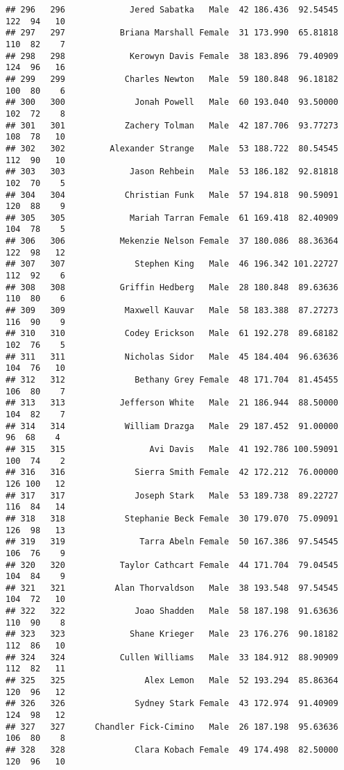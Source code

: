 \documentclass[
]{article}
\begin{document}
\begin{verbatim}
## 296   296             Jered Sabatka   Male  42 186.436  92.54545 122  94   10
## 297   297           Briana Marshall Female  31 173.990  65.81818 110  82    7
## 298   298             Kerowyn Davis Female  38 183.896  79.40909 124  96   16
## 299   299            Charles Newton   Male  59 180.848  96.18182 100  80    6
## 300   300              Jonah Powell   Male  60 193.040  93.50000 102  72    8
## 301   301            Zachery Tolman   Male  42 187.706  93.77273 108  78   10
## 302   302         Alexander Strange   Male  53 188.722  80.54545 112  90   10
## 303   303             Jason Rehbein   Male  53 186.182  92.81818 102  70    5
## 304   304            Christian Funk   Male  57 194.818  90.59091 120  88    9
## 305   305             Mariah Tarran Female  61 169.418  82.40909 104  78    5
## 306   306           Mekenzie Nelson Female  37 180.086  88.36364 122  98   12
## 307   307              Stephen King   Male  46 196.342 101.22727 112  92    6
## 308   308           Griffin Hedberg   Male  28 180.848  89.63636 110  80    6
## 309   309            Maxwell Kauvar   Male  58 183.388  87.27273 116  90    9
## 310   310            Codey Erickson   Male  61 192.278  89.68182 102  76    5
## 311   311            Nicholas Sidor   Male  45 184.404  96.63636 104  76   10
## 312   312              Bethany Grey Female  48 171.704  81.45455 106  80    7
## 313   313           Jefferson White   Male  21 186.944  88.50000 104  82    7
## 314   314            William Drazga   Male  29 187.452  91.00000  96  68    4
## 315   315                 Avi Davis   Male  41 192.786 100.59091 100  74    2
## 316   316              Sierra Smith Female  42 172.212  76.00000 126 100   12
## 317   317              Joseph Stark   Male  53 189.738  89.22727 116  84   14
## 318   318            Stephanie Beck Female  30 179.070  75.09091 126  98   13
## 319   319               Tarra Abeln Female  50 167.386  97.54545 106  76    9
## 320   320           Taylor Cathcart Female  44 171.704  79.04545 104  84    9
## 321   321          Alan Thorvaldson   Male  38 193.548  97.54545 104  72   10
## 322   322              Joao Shadden   Male  58 187.198  91.63636 110  90    8
## 323   323             Shane Krieger   Male  23 176.276  90.18182 112  86   10
## 324   324           Cullen Williams   Male  33 184.912  88.90909 112  82   11
## 325   325                Alex Lemon   Male  52 193.294  85.86364 120  96   12
## 326   326              Sydney Stark Female  43 172.974  91.40909 124  98   12
## 327   327      Chandler Fick-Cimino   Male  26 187.198  95.63636 106  80    8
## 328   328              Clara Kobach Female  49 174.498  82.50000 120  96   10

\end{verbatim}
\end{document}

